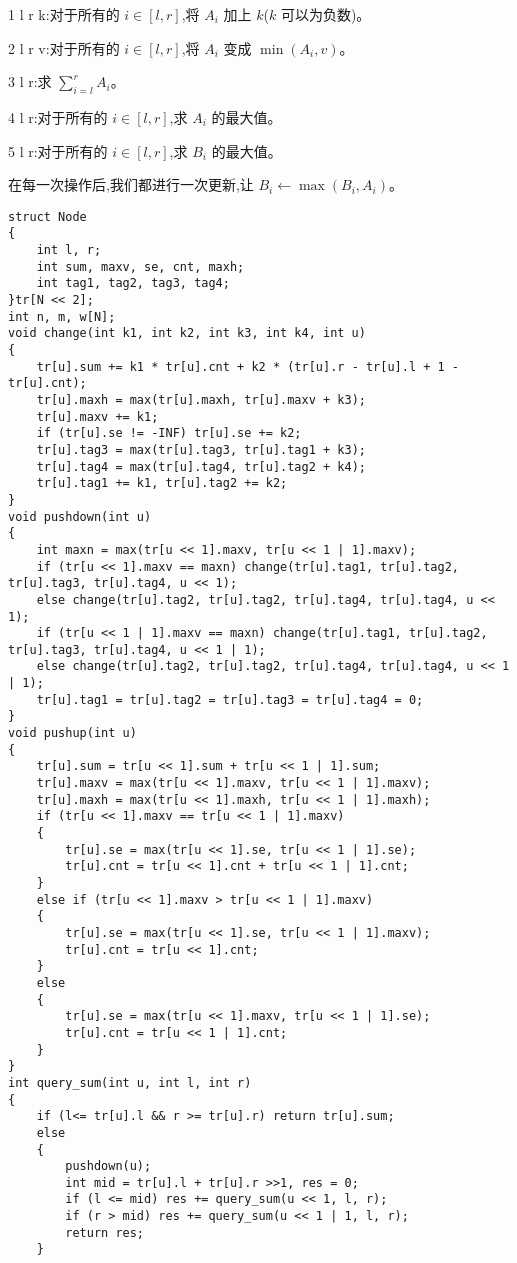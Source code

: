 \documentclass[a4paper, fontset=none]{ctexart}
\begin{document}
1 l r k:对于所有的 $i\in[l, r]$,将 $A_i$ 加上 $k$($k$ 可以为负数)。

2 l r v:对于所有的 $i\in[l, r]$,将 $A_i$ 变成 $\min(A_i, v)$。

3 l r:求 $\sum_{i=l}^{r}A_i$。

4 l r:对于所有的 $i\in[l, r]$,求 $A_i$ 的最大值。

5 l r:对于所有的 $i\in[l, r]$,求 $B_i$ 的最大值。

在每一次操作后,我们都进行一次更新,让 $B_i\gets\max(B_i, A_i)$。

\begin{verbatim}
struct Node
{
    int l, r;
    int sum, maxv, se, cnt, maxh;
    int tag1, tag2, tag3, tag4;
}tr[N << 2];
int n, m, w[N];
void change(int k1, int k2, int k3, int k4, int u)
{
    tr[u].sum += k1 * tr[u].cnt + k2 * (tr[u].r - tr[u].l + 1 - tr[u].cnt);
    tr[u].maxh = max(tr[u].maxh, tr[u].maxv + k3);
    tr[u].maxv += k1;
    if (tr[u].se != -INF) tr[u].se += k2;
    tr[u].tag3 = max(tr[u].tag3, tr[u].tag1 + k3);
    tr[u].tag4 = max(tr[u].tag4, tr[u].tag2 + k4);
    tr[u].tag1 += k1, tr[u].tag2 += k2;
}
void pushdown(int u)
{
    int maxn = max(tr[u << 1].maxv, tr[u << 1 | 1].maxv);
    if (tr[u << 1].maxv == maxn) change(tr[u].tag1, tr[u].tag2, tr[u].tag3, tr[u].tag4, u << 1);
    else change(tr[u].tag2, tr[u].tag2, tr[u].tag4, tr[u].tag4, u << 1);
    if (tr[u << 1 | 1].maxv == maxn) change(tr[u].tag1, tr[u].tag2, tr[u].tag3, tr[u].tag4, u << 1 | 1);
    else change(tr[u].tag2, tr[u].tag2, tr[u].tag4, tr[u].tag4, u << 1 | 1);
    tr[u].tag1 = tr[u].tag2 = tr[u].tag3 = tr[u].tag4 = 0;
}
void pushup(int u)
{
    tr[u].sum = tr[u << 1].sum + tr[u << 1 | 1].sum;
    tr[u].maxv = max(tr[u << 1].maxv, tr[u << 1 | 1].maxv);
    tr[u].maxh = max(tr[u << 1].maxh, tr[u << 1 | 1].maxh);
    if (tr[u << 1].maxv == tr[u << 1 | 1].maxv)
    {
        tr[u].se = max(tr[u << 1].se, tr[u << 1 | 1].se);
        tr[u].cnt = tr[u << 1].cnt + tr[u << 1 | 1].cnt;
    }
    else if (tr[u << 1].maxv > tr[u << 1 | 1].maxv)
    {
        tr[u].se = max(tr[u << 1].se, tr[u << 1 | 1].maxv);
        tr[u].cnt = tr[u << 1].cnt;
    }
    else
    {
        tr[u].se = max(tr[u << 1].maxv, tr[u << 1 | 1].se);
        tr[u].cnt = tr[u << 1 | 1].cnt;
    }
}
int query_sum(int u, int l, int r)
{
    if (l<= tr[u].l && r >= tr[u].r) return tr[u].sum;
    else
    {
        pushdown(u);
        int mid = tr[u].l + tr[u].r >>1, res = 0;
        if (l <= mid) res += query_sum(u << 1, l, r);
        if (r > mid) res += query_sum(u << 1 | 1, l, r);
        return res;
    }

\end{verbatim}
\end{document}
